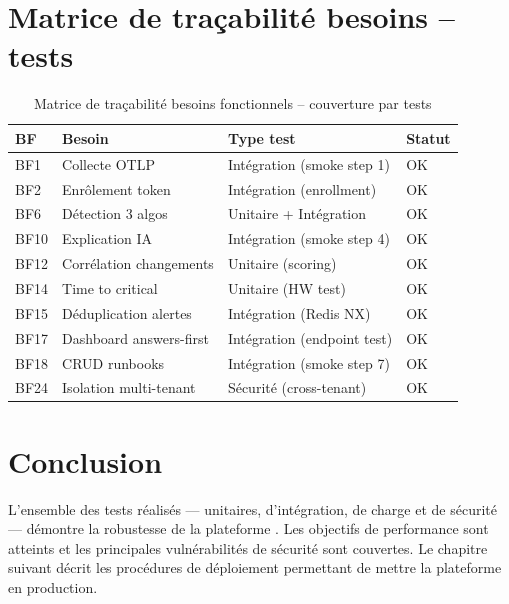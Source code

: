 \section{Matrice de traçabilité besoins -- tests}

\begin{table}[H]
\centering
\caption{Matrice de traçabilité besoins fonctionnels -- couverture par tests}
\label{tab:tracabilite-tests}
\small
\begin{tabularx}{\textwidth}{lXll}
\toprule
\textbf{BF} & \textbf{Besoin} & \textbf{Type test} & \textbf{Statut} \\
\midrule
BF1  & Collecte OTLP          & Intégration (smoke step 1) & \textcolor{SuccessGreen}{OK} \\
BF2  & Enrôlement token        & Intégration (enrollment)   & \textcolor{SuccessGreen}{OK} \\
BF6  & Détection 3 algos       & Unitaire + Intégration      & \textcolor{SuccessGreen}{OK} \\
BF10 & Explication IA          & Intégration (smoke step 4)  & \textcolor{SuccessGreen}{OK} \\
BF12 & Corrélation changements & Unitaire (scoring)          & \textcolor{SuccessGreen}{OK} \\
BF14 & Time to critical        & Unitaire (HW test)          & \textcolor{SuccessGreen}{OK} \\
BF15 & Déduplication alertes   & Intégration (Redis NX)      & \textcolor{SuccessGreen}{OK} \\
BF17 & Dashboard answers-first & Intégration (endpoint test) & \textcolor{SuccessGreen}{OK} \\
BF18 & CRUD runbooks           & Intégration (smoke step 7)  & \textcolor{SuccessGreen}{OK} \\
BF24 & Isolation multi-tenant  & Sécurité (cross-tenant)     & \textcolor{SuccessGreen}{OK} \\
\bottomrule
\end{tabularx}
\end{table}

\section*{Conclusion}

L'ensemble des tests réalisés --- unitaires, d'intégration, de charge et de
sécurité --- démontre la robustesse de la plateforme \caimp{}. Les objectifs
de performance sont atteints et les principales vulnérabilités de sécurité
sont couvertes. Le chapitre suivant décrit les procédures de déploiement
permettant de mettre la plateforme en production.
